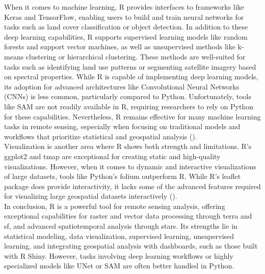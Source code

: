 \documentclass[a4paper,12pt]{article}
\begin{document}
When it comes to machine learning, R provides interfaces to frameworks like Keras and TensorFlow, enabling users to build and train neural networks for tasks such as land cover classification or object detection. In addition to these deep learning capabilities, R supports supervised learning models like random forests and support vector machines, as well as unsupervised methods like k-means clustering or hierarchical clustering. These methods are well-suited for tasks such as identifying land use patterns or segmenting satellite imagery based on spectral properties. While R is capable of implementing deep learning models, its adoption for advanced architectures like Convolutional Neural Networks (CNNs) is less common, particularly compared to Python. Unfortunately, tools like SAM are not readily available in R, requiring researchers to rely on Python for these capabilities. Nevertheless, R remains effective for many machine learning tasks in remote sensing, especially when focusing on traditional models and workflows that prioritize statistical and geospatial analysis (\cite{priyadharshini_r_2015}).\\
Visualization is another area where R shows both strength and limitations. R’s ggplot2 and tmap are exceptional for creating static and high-quality visualizations. However, when it comes to dynamic and interactive visualizations of large datasets, tools like Python's folium outperform R. While R’s leaflet package does provide interactivity, it lacks some of the advanced features required for visualizing large geospatial datasets interactively (\cite{chege_comparing_2024}).\\
In conclusion, R is a powerful tool for remote sensing analysis, offering exceptional capabilities for raster and vector data processing through terra and sf, and advanced spatiotemporal analysis through stars. Its strengths lie in statistical modeling, data visualization, supervised learning, unsupervised learning, and integrating geospatial analysis with dashboards, such as those built with R Shiny. However, tasks involving deep learning workflows or highly specialized models like UNet or SAM are often better handled in Python.\\
\end{document}
